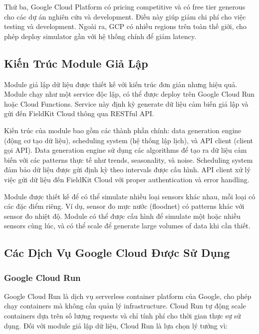 Thứ ba, Google Cloud Platform có pricing competitive và có free tier generous cho các dự án nghiên cứu và development. Điều này giúp giảm chi phí cho việc testing và development. Ngoài ra, GCP có nhiều regions trên toàn thế giới, cho phép deploy simulator gần với hệ thống chính để giảm latency.

\subsection{Kiến Trúc Module Giả Lập}

Module giả lập dữ liệu được thiết kế với kiến trúc đơn giản nhưng hiệu quả. Module chạy như một service độc lập, có thể được deploy trên Google Cloud Run hoặc Cloud Functions. Service này định kỳ generate dữ liệu cảm biến giả lập và gửi đến FieldKit Cloud thông qua RESTful API. 

Kiến trúc của module bao gồm các thành phần chính: data generation engine (động cơ tạo dữ liệu), scheduling system (hệ thống lập lịch), và API client (client gọi API). Data generation engine sử dụng các algorithms để tạo ra dữ liệu cảm biến với các patterns thực tế như trends, seasonality, và noise. Scheduling system đảm bảo dữ liệu được gửi định kỳ theo intervals được cấu hình. API client xử lý việc gửi dữ liệu đến FieldKit Cloud với proper authentication và error handling.

Module được thiết kế để có thể simulate nhiều loại sensors khác nhau, mỗi loại có các đặc điểm riêng. Ví dụ, sensor đo mực nước (floodnet) có patterns khác với sensor đo nhiệt độ. Module có thể được cấu hình để simulate một hoặc nhiều sensors cùng lúc, và có thể scale để generate large volumes of data khi cần thiết.

\subsection{Các Dịch Vụ Google Cloud Được Sử Dụng}

\subsubsection{Google Cloud Run}

Google Cloud Run là dịch vụ serverless container platform của Google, cho phép chạy containers mà không cần quản lý infrastructure. Cloud Run tự động scale containers dựa trên số lượng requests và chỉ tính phí cho thời gian thực sự sử dụng. Đối với module giả lập dữ liệu, Cloud Run là lựa chọn lý tưởng vì:

